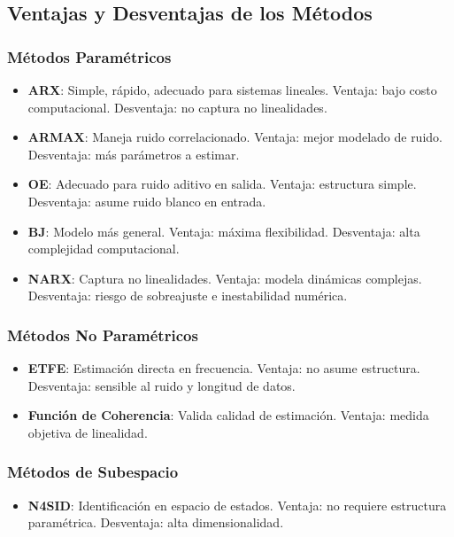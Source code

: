 \documentclass[a4paper,openright,9pt]{report}
\begin{document}
\subsection{Ventajas y Desventajas de los Métodos}

\subsubsection{Métodos Paramétricos}
\begin{itemize}
\item \textbf{ARX}: Simple, rápido, adecuado para sistemas lineales. Ventaja: bajo costo computacional. Desventaja: no captura no linealidades.
\item \textbf{ARMAX}: Maneja ruido correlacionado. Ventaja: mejor modelado de ruido. Desventaja: más parámetros a estimar.
\item \textbf{OE}: Adecuado para ruido aditivo en salida. Ventaja: estructura simple. Desventaja: asume ruido blanco en entrada.
\item \textbf{BJ}: Modelo más general. Ventaja: máxima flexibilidad. Desventaja: alta complejidad computacional.
\item \textbf{NARX}: Captura no linealidades. Ventaja: modela dinámicas complejas. Desventaja: riesgo de sobreajuste e inestabilidad numérica.
\end{itemize}

\subsubsection{Métodos No Paramétricos}
\begin{itemize}
\item \textbf{ETFE}: Estimación directa en frecuencia. Ventaja: no asume estructura. Desventaja: sensible al ruido y longitud de datos.
\item \textbf{Función de Coherencia}: Valida calidad de estimación. Ventaja: medida objetiva de linealidad.
\end{itemize}

\subsubsection{Métodos de Subespacio}
\begin{itemize}
\item \textbf{N4SID}: Identificación en espacio de estados. Ventaja: no requiere estructura paramétrica. Desventaja: alta dimensionalidad.
\end{itemize}
\end{document}
